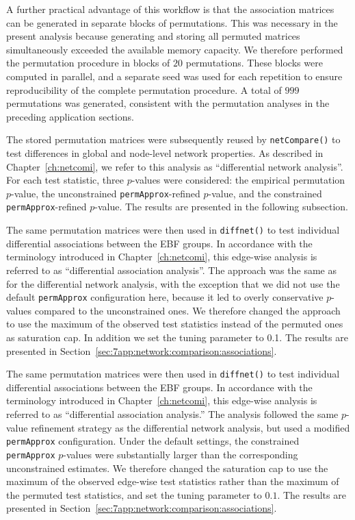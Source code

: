 A further practical advantage of this workflow is that the association matrices can be generated in separate blocks of permutations. This was necessary in the present analysis because generating and storing all permuted matrices simultaneously exceeded the available memory capacity. We therefore performed the permutation procedure in blocks of $20$ permutations. These blocks were computed in parallel, and a separate seed was used for each repetition to ensure reproducibility of the complete permutation procedure. A total of $999$ permutations was generated, consistent with the permutation analyses in the preceding application sections.

The stored permutation matrices were subsequently reused by \texttt{netCompare()} to test differences in global and node-level network properties. As described in Chapter~\ref{ch:netcomi}, we refer to this analysis as ``differential network analysis''. For each test statistic, three $p$-values were considered: the empirical permutation $p$-value, the unconstrained \texttt{permApprox}-refined $p$-value, and the constrained \texttt{permApprox}-refined $p$-value. The results are presented in the following subsection.

The same permutation matrices were then used in \texttt{diffnet()} to test individual differential associations between the EBF groups. In accordance with the terminology introduced in Chapter~\ref{ch:netcomi}, this edge-wise analysis is referred to as ``differential association analysis''. The approach was the same as for the differential network analysis, with the exception that we did not use the default \texttt{permApprox} configuration here, because it led to overly conservative $p$-values compared to the unconstrained ones. We therefore changed the approach to use the maximum of the observed test statistics instead of the permuted ones as saturation cap. In addition we set the tuning parameter to 0.1. The results are presented in Section~\ref{sec:7app:network:comparison:associations}.

The same permutation matrices were then used in \texttt{diffnet()} to test individual differential associations between the EBF groups. In accordance with the terminology introduced in Chapter~\ref{ch:netcomi}, this edge-wise analysis is referred to as ``differential association analysis.'' The analysis followed the same $p$-value refinement strategy as the differential network analysis, but used a modified \texttt{permApprox} configuration. Under the default settings, the constrained \texttt{permApprox} $p$-values were substantially larger than the corresponding unconstrained estimates. We therefore changed the saturation cap to use the maximum of the observed edge-wise test statistics rather than the maximum of the permuted test statistics, and set the tuning parameter to $0.1$. The results are presented in Section~\ref{sec:7app:network:comparison:associations}.

